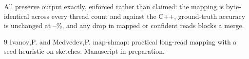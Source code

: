 \documentclass[10pt,a4paper,twocolumn]{article}
\begin{document}
All \shmNumExactOptimizations{} preserve output exactly, enforced rather than
claimed: the mapping is byte-identical across every thread count and against
the C++, ground-truth accuracy is unchanged at \shmAccMin--\shmAccMax\%, and any
drop in mapped or confident reads blocks a merge.
\small
\begin{thebibliography}{9}
\setlength{\itemsep}{0pt}\setlength{\parskip}{0pt}
 Ivanov,P. and Medvedev,P. map-shmap: practical long-read mapping with a seed heuristic on sketches. Manuscript in preparation.
\end{thebibliography}
\end{document}
